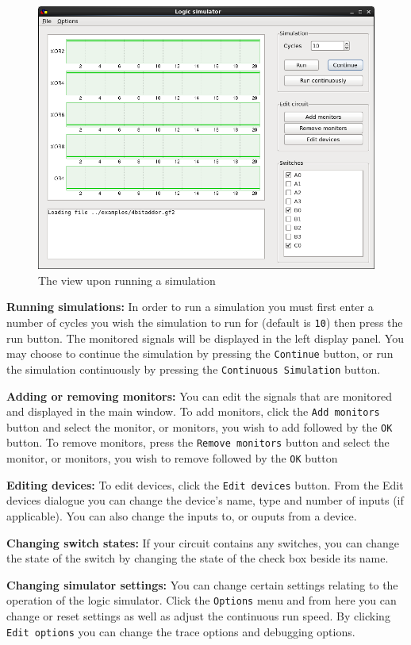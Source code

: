 \documentclass[a4paper,10pt]{article}
\begin{document}
\begin{figure}[h]
        \centering
        \includegraphics[width=.8\textwidth]{../../report2/jam96/simulation}
        \caption{The view upon running a simulation}
        \label{fig:simulation}
\end{figure}

\textbf{Running simulations:} In order to run a simulation you must first enter a number of cycles you wish the simulation to run for (default is \texttt{10}) then press the run button. The monitored signals will be displayed in the left display panel. You may choose to continue the simulation by pressing the \texttt{Continue} button, or run the simulation continuously by pressing the \texttt{Continuous Simulation} button.

\textbf{Adding or removing monitors:} You can edit the signals that are monitored and displayed in the main window. To add monitors, click the \texttt{Add monitors} button and select the monitor, or monitors, you wish to add followed by the \texttt{OK} button. To remove monitors, press the \texttt{Remove monitors} button and select the monitor, or monitors, you wish to remove followed by the \texttt{OK} button

\textbf{Editing devices:} To edit devices, click the \texttt{Edit devices} button. From the Edit devices dialogue you can change the device's name, type and number of inputs (if applicable). You can also change the inputs to, or ouputs from a device.

\textbf{Changing switch states:} If your circuit contains any  switches, you can change the state of the switch by changing the state of the check box beside its name.

\textbf{Changing simulator settings:} You can change certain settings relating to the operation of the logic simulator. Click the \texttt{Options} menu and from here you can change or reset settings as well as adjust the continuous run speed. By clicking \texttt{Edit options} you can change the trace options and debugging options.
\end{document}
